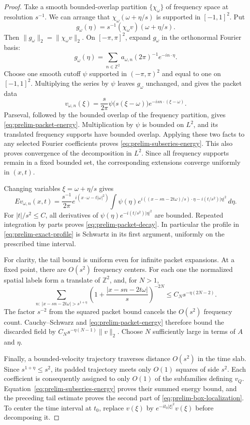 \begin{proof}
Take a smooth bounded-overlap partition $\{\chi_\omega\}$ of frequency
space at resolution $s^{-1}$.  We can arrange that
$\chi_\omega(\omega+\eta/s)$ is supported in $[-1,1]^2$.  Put
\[
 g_\omega(\eta)=s^{-1}(\chi_\omega v)(\omega+\eta/s).
\]
Then $\|g_\omega\|_2=\|\chi_\omega v\|_2$.  On
$[-\pi,\pi]^2$, expand $g_\omega$ in the orthonormal Fourier basis:
\[
 g_\omega(\eta)=\sum_{n\in\mathbb{Z}^2}
 a_{\omega,n}(2\pi)^{-1}e^{-in\cdot\eta}.
\]
Choose one smooth cutoff $\psi$ supported in $(-\pi,\pi)^2$ and equal to
one on $[-1,1]^2$.  Multiplying the series by $\psi$ leaves $g_\omega$
unchanged, and gives the packet data
\[
 v_{\omega,n}(\xi)=\frac{s}{2\pi}
 \psi\bigl(s(\xi-\omega)\bigr)
 e^{-isn\cdot(\xi-\omega)}.
\]
Parseval, followed by the bounded overlap of the frequency partition, gives
\eqref{eq:prelim-packet-energy}.  Multiplication by $\psi$ is bounded on
$L^2$, and its translated frequency supports have bounded overlap.  Applying
these two facts to any selected Fourier coefficients proves
\eqref{eq:prelim-subseries-energy}.  This also proves convergence of the
decomposition in $L^2$.  Since all frequency supports remain in a fixed bounded
set, the corresponding extensions converge uniformly in $(x,t)$.

Changing variables $\xi=\omega+\eta/s$ gives
\begin{equation}
 Ev_{\omega,n}(x,t)=\frac{s^{-1}}{2\pi}
 e^{i(x\cdot\omega-t|\omega|^2)}
 \int \psi(\eta)
 e^{i((x-sn-2t\omega)/s)\cdot\eta-i(t/s^2)|\eta|^2}\,d\eta.
 \label{eq:prelim-exact-profile}
\end{equation}
For $|t|/s^2\leq C$, all derivatives of
$\psi(\eta)e^{-i(t/s^2)|\eta|^2}$ are bounded.  Repeated integration by
parts proves \eqref{eq:prelim-packet-decay}.  In particular the profile in
\eqref{eq:prelim-exact-profile} is Schwartz in its first argument, uniformly
on the prescribed time interval.

For clarity, the tail bound is uniform even for infinite packet expansions.
At a fixed point, there are $O(s^2)$ frequency centers.  For each one the
normalized spatial labels form a translate of $\mathbb{Z}^2$, and, for $N>1$,
\[
 \sum_{n:\ |x-sn-2t\omega|>s^{1+\eta}}
 \left(1+\frac{|x-sn-2t\omega|}{s}\right)^{-2N}
 \leq C_Ns^{-\eta(2N-2)}.
\]
The factor $s^{-2}$ from the squared packet bound cancels the
$O(s^2)$ frequency count.  Cauchy--Schwarz and
\eqref{eq:prelim-packet-energy} therefore bound the discarded field by
$C_Ns^{-\eta(N-1)}\|v\|_2$.  Choose $N$ sufficiently large in terms of
$A$ and $\eta$.

Finally, a bounded-velocity trajectory traverses distance $O(s^2)$ in the
time slab.  Since $s^{1+\eta}\leq s^2$, its padded trajectory meets only
$O(1)$ squares of side $s^2$.  Each coefficient is consequently assigned to
only $O(1)$ of the subfamilies defining $v_Q$.
Equation~\eqref{eq:prelim-subseries-energy} proves their summed energy
bound, and the preceding tail estimate proves the second part of
\eqref{eq:prelim-box-localization}.  To center the time interval at $t_0$,
replace $v(\xi)$ by $e^{-it_0|\xi|^2}v(\xi)$ before decomposing it.
\end{proof}

